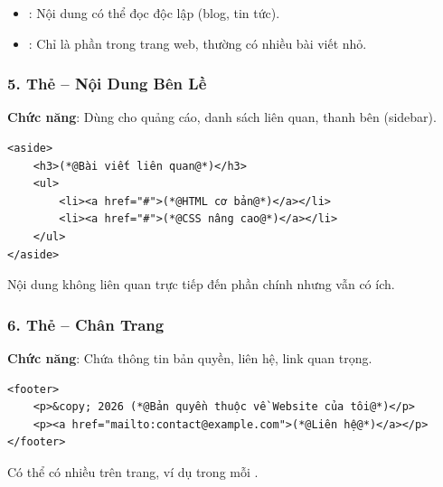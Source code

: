 \begin{conceptBox}
\begin{itemize}[leftmargin=1.5em, itemsep=2pt, parsep=0pt]
    \item {}: Nội dung có thể đọc độc lập (blog, tin tức).
    \item {}: Chỉ là phần trong trang web, thường có nhiều bài viết nhỏ.
\end{itemize}
\end{conceptBox}

\subsubsection{5. Thẻ  -- Nội Dung Bên Lề}
\textbf{Chức năng}: Dùng cho quảng cáo, danh sách liên quan, thanh bên (sidebar).

\begin{codeWindow}
\begin{lstlisting}[language=HTML5]
<aside>
    <h3>(*@Bài viết liên quan@*)</h3>
    <ul>
        <li><a href="#">(*@HTML cơ bản@*)</a></li>
        <li><a href="#">(*@CSS nâng cao@*)</a></li>
    </ul>
</aside>
\end{lstlisting}
\end{codeWindow}

\begin{noteBox}
Nội dung không liên quan trực tiếp đến phần chính nhưng vẫn có ích.
\end{noteBox}

\subsubsection{6. Thẻ  -- Chân Trang}
\textbf{Chức năng}: Chứa thông tin bản quyền, liên hệ, link quan trọng.

\begin{codeWindow}
\begin{lstlisting}[language=HTML5]
<footer>
    <p>&copy; 2026 (*@Bản quyền thuộc về Website của tôi@*)</p>
    <p><a href="mailto:contact@example.com">(*@Liên hệ@*)</a></p>
</footer>
\end{lstlisting}
\end{codeWindow}

\begin{noteBox}
Có thể có nhiều  trên trang, ví dụ trong mỗi .
\end{noteBox}

